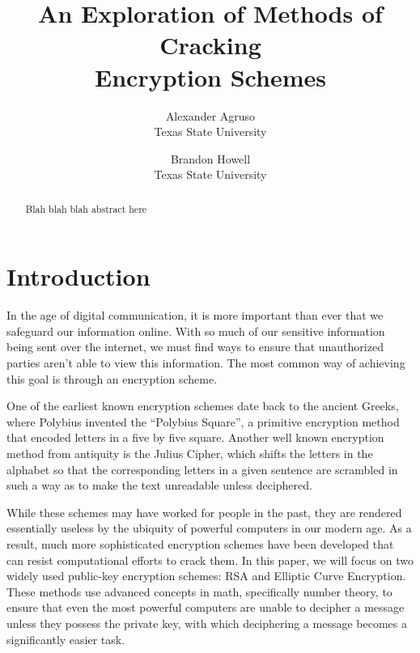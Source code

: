 \documentclass[letterpaper,twocolumn,12pt]{article}
\begin{document}
    \date{}

    \title{ An Exploration of Methods of Cracking \\
        Encryption Schemes }

    \author{
        { \rm Alexander Agruso } \\
        { \rm Texas State University }
        \and
        { \rm Brandon Howell } \\
        { \rm Texas State University }
    }

    \maketitle

    \begin{abstract}
        Blah blah blah abstract here
    \end{abstract}

    \section*{Introduction}

    In the age of digital communication, it is more important than ever that we
    safeguard our information online.
    With so much of our sensitive information being sent over the internet, we
    must find ways to ensure that unauthorized parties aren't able to view this
    information.
    The most common way of achieving this goal is through an encryption scheme.
    
    One of the earliest known encryption schemes date back to the ancient
    Greeks, where Polybius invented the ``Polybius Square'', a primitive
    encryption method that encoded letters in a five by five square.
    Another well known encryption method from antiquity is the Julius Cipher,
    which shifts the letters in the alphabet so that the corresponding letters
    in a given sentence are scrambled in such a way as to make the text
    unreadable unless deciphered.

    While these schemes may have worked for people in the past, they are
    rendered essentially useless by the ubiquity of powerful computers in our
    modern age.
    As a result, much more sophisticated encryption schemes have been developed
    that can resist computational efforts to crack them. In this paper, we will
    focus on two widely used public-key encryption schemes: RSA and Elliptic
    Curve Encryption.
    These methods use advanced concepts in math, specifically number theory, to
    ensure that even the most powerful computers are unable to decipher a
    message unless they possess the private key, with which deciphering a
    message becomes a significantly easier task.
    
\end{document}
